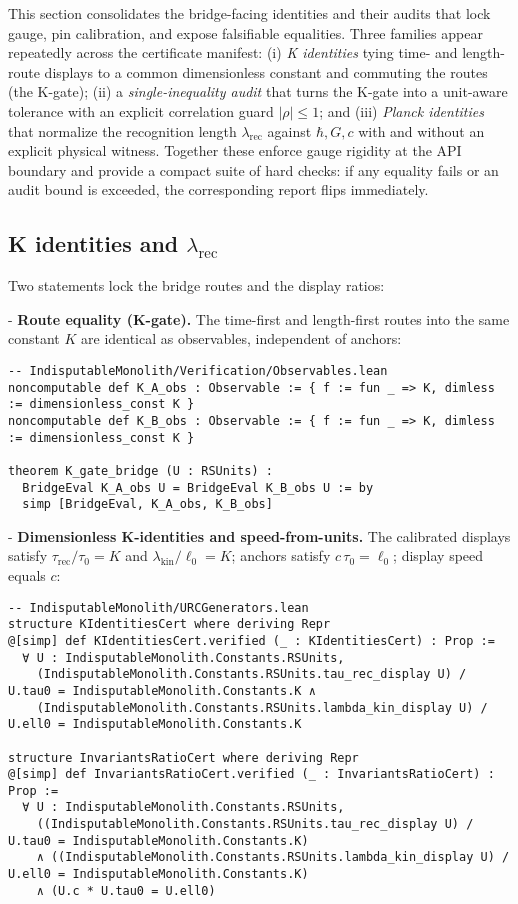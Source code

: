 \documentclass[11pt,a4paper,twoside]{article}
\numberwithin{equation}{section}
\theoremstyle{customthm}
\theoremstyle{customdef}
\theoremstyle{customrem}
\begin{document}
This section consolidates the bridge-facing identities and their audits that lock gauge, pin calibration, and expose falsifiable equalities. Three families appear repeatedly across the certificate manifest: (i) \emph{K identities} tying time- and length-route displays to a common dimensionless constant and commuting the routes (the K-gate); (ii) a \emph{single-inequality audit} that turns the K-gate into a unit-aware tolerance with an explicit correlation guard \(|\rho|\le 1\); and (iii) \emph{Planck identities} that normalize the recognition length \(\lambda_{\mathrm{rec}}\) against \(\hbar,G,c\) with and without an explicit physical witness. Together these enforce gauge rigidity at the API boundary and provide a compact suite of hard checks: if any equality fails or an audit bound is exceeded, the corresponding report flips immediately.

\subsection{K identities and \(\lambda_{\mathrm{rec}}\)}\label{subsec:audit-k-lrec}

Two statements lock the bridge routes and the display ratios:

- \textbf{Route equality (K-gate).} The time-first and length-first routes into the same constant \(K\) are identical as observables, independent of anchors:
\begin{lstlisting}
-- IndisputableMonolith/Verification/Observables.lean
noncomputable def K_A_obs : Observable := { f := fun _ => K, dimless := dimensionless_const K }
noncomputable def K_B_obs : Observable := { f := fun _ => K, dimless := dimensionless_const K }

theorem K_gate_bridge (U : RSUnits) :
  BridgeEval K_A_obs U = BridgeEval K_B_obs U := by
  simp [BridgeEval, K_A_obs, K_B_obs]
\end{lstlisting}

- \textbf{Dimensionless K-identities and speed-from-units.} The calibrated displays satisfy \(\tau_{\mathrm{rec}}/\tau_0 = K\) and \(\lambda_{\mathrm{kin}}/\ell_0 = K\); anchors satisfy \(c\,\tau_0=\ell_0\); display speed equals \(c\):
\begin{lstlisting}
-- IndisputableMonolith/URCGenerators.lean
structure KIdentitiesCert where deriving Repr
@[simp] def KIdentitiesCert.verified (_ : KIdentitiesCert) : Prop :=
  ∀ U : IndisputableMonolith.Constants.RSUnits,
    (IndisputableMonolith.Constants.RSUnits.tau_rec_display U) / U.tau0 = IndisputableMonolith.Constants.K ∧
    (IndisputableMonolith.Constants.RSUnits.lambda_kin_display U) / U.ell0 = IndisputableMonolith.Constants.K

structure InvariantsRatioCert where deriving Repr
@[simp] def InvariantsRatioCert.verified (_ : InvariantsRatioCert) : Prop :=
  ∀ U : IndisputableMonolith.Constants.RSUnits,
    ((IndisputableMonolith.Constants.RSUnits.tau_rec_display U) / U.tau0 = IndisputableMonolith.Constants.K)
    ∧ ((IndisputableMonolith.Constants.RSUnits.lambda_kin_display U) / U.ell0 = IndisputableMonolith.Constants.K)
    ∧ (U.c * U.tau0 = U.ell0)
\end{lstlisting}
\end{document}

